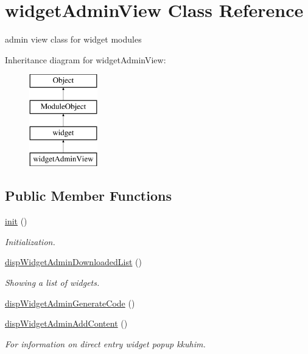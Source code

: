 \hypertarget{classwidgetAdminView}{}\section{widget\+Admin\+View Class Reference}
\label{classwidgetAdminView}


admin view class for widget modules  


Inheritance diagram for widget\+Admin\+View\+:\begin{figure}[H]
\begin{center}
\leavevmode
\includegraphics[height=4.000000cm]{classwidgetAdminView}
\end{center}
\end{figure}
\subsection*{Public Member Functions}
\begin{DoxyCompactItemize}
\item 
\hyperlink{classwidgetAdminView_a6445179410099d3fa2b13a8e080d805b}{init} ()
\begin{DoxyCompactList}\small\item\em Initialization. \end{DoxyCompactList}\item 
\hyperlink{classwidgetAdminView_ad5defcecf21fb470cb6c3b2e868941a0}{disp\+Widget\+Admin\+Downloaded\+List} ()
\begin{DoxyCompactList}\small\item\em Showing a list of widgets. \end{DoxyCompactList}\item 
\hyperlink{classwidgetAdminView_ad7ff38d629f723021518ac9ec7a88933}{disp\+Widget\+Admin\+Generate\+Code} ()
\item 
\hyperlink{classwidgetAdminView_a2f499c5195c994d427e80b9e3cbaa7ef}{disp\+Widget\+Admin\+Add\+Content} ()
\begin{DoxyCompactList}\small\item\em For information on direct entry widget popup kkuhim. \end{DoxyCompactList}\end{DoxyCompactItemize}
